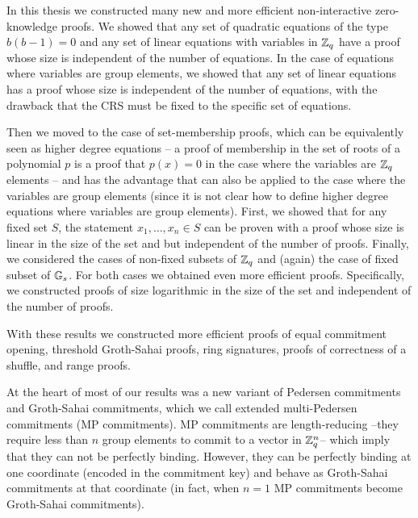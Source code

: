 In this thesis we constructed many new and more efficient non-interactive  zero-knowledge proofs. We showed that any set of quadratic equations of the type $b(b-1)=0$ and any set of linear equations with variables in $\mathbb{Z}_q$ have a proof whose size is independent of the number of equations. In the case of equations where variables are group elements, we showed that any set of linear equations has a proof whose size is independent of the number of equations, with the drawback that the CRS must be fixed to the specific set of equations.

Then we moved to the case of set-membership proofs, which can be equivalently seen as higher degree equations -- a proof of membership in the set of roots of a polynomial $p$ is a proof that $p(x)=0$ in the case where the variables are $\mathbb{Z}_q$ elements -- and has the advantage that can also be applied to the case where the variables are group elements (since it is not clear how to define higher degree equations where variables are group elements). First, we showed that for any fixed set $S$, the statement $x_1,\ldots,x_n\in S$ can be proven with a proof whose size is linear in the size of the set and but independent of the number of proofs. 
Finally, we considered the cases of non-fixed subsets of $\mathbb{Z}_q$ and (again) the case of fixed subset of $\mathbb{G}_s$. For both cases we obtained even more efficient proofs. Specifically, we constructed proofs of size logarithmic in the size of the set and independent of the number of proofs.

With these results we constructed more efficient proofs of equal commitment opening, threshold Groth-Sahai proofs, ring signatures, proofs of correctness of a shuffle, and range proofs.

At the heart of most of our results was a new variant of Pedersen commitments and Groth-Sahai commitments, which we call extended multi-Pedersen commitments (MP commitments). MP commitments are length-reducing --they require less than $n$ group elements to commit to a vector in $\mathbb{Z}_q^n$-- which imply that they can not be perfectly binding. However, they can be perfectly binding at one coordinate (encoded in the commitment key) and behave as Groth-Sahai commitments at that coordinate (in fact, when $n=1$ MP commitments become Groth-Sahai commitments).

